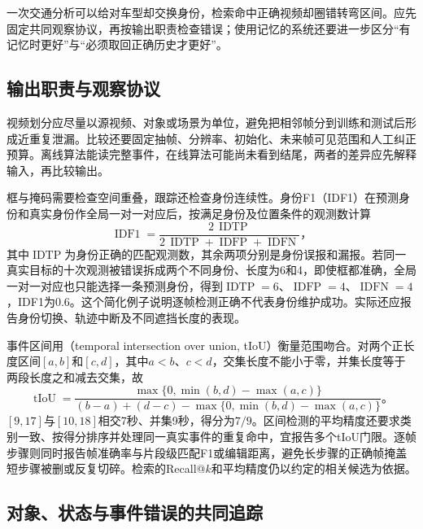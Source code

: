 一次交通分析可以给对车型却交换身份，检索命中正确视频却圈错转弯区间。应先固定共同观察协议，再按输出职责检查错误；使用记忆的系统还要进一步区分“有记忆时更好”与“必须取回正确历史才更好”。

\subsection{输出职责与观察协议}
\label{sec:vision-video-output-protocol}

视频划分应尽量以源视频、对象或场景为单位，避免把相邻帧分到训练和测试后形成近重复泄漏。比较还要固定抽帧、分辨率、初始化、未来帧可见范围和人工纠正预算。离线算法能读完整事件，在线算法可能尚未看到结尾，两者的差异应先解释输入，再比较输出。

框与掩码需要检查空间重叠，跟踪还检查身份连续性。身份F1（IDF1）在预测身份和真实身份作全局一对一对应后，按满足身份及位置条件的观测数计算
\begin{equation}
  \operatorname{IDF1}
  =\frac{2\,\operatorname{IDTP}}
  {2\,\operatorname{IDTP}+\operatorname{IDFP}+\operatorname{IDFN}}\text{，}
  \label{eq:vision-video-idf1}
\end{equation}
其中$\operatorname{IDTP}$为身份正确的匹配观测数，其余两项分别是身份误报和漏报。若同一真实目标的十次观测被错误拆成两个不同身份、长度为6和4，即使框都准确，全局一对一对应也只能选择一条预测身份，得到$\operatorname{IDTP}=6$、$\operatorname{IDFP}=4$、$\operatorname{IDFN}=4$，IDF1为0.6。这个简化例子说明逐帧检测正确不代表身份维护成功。实际还应报告身份切换、轨迹中断及不同遮挡长度的表现。

事件区间用（temporal intersection over union, tIoU）衡量范围吻合。对两个正长度区间$[a,b]$和$[c,d]$，其中$a<b$、$c<d$，交集长度不能小于零，并集长度等于两段长度之和减去交集，故
\begin{equation}
  \operatorname{tIoU}
  =\frac{\max\{0,\min(b,d)-\max(a,c)\}}
  {(b-a)+(d-c)-\max\{0,\min(b,d)-\max(a,c)\}}\text{。}
  \label{eq:vision-video-tiou}
\end{equation}
$[9,17]$与$[10,18]$相交7秒、并集9秒，得分为$7/9$。区间检测的平均精度还要求类别一致、按得分排序并处理同一真实事件的重复命中，宜报告多个tIoU门限。逐帧步骤则同时报告帧准确率与片段级匹配F1或编辑距离，避免长步骤的正确帧掩盖短步骤被删或反复切碎。检索的Recall@$k$和平均精度仍以约定的相关候选为依据。

\subsection{对象、状态与事件错误的共同追踪}
\label{sec:vision-video-error-trace}

